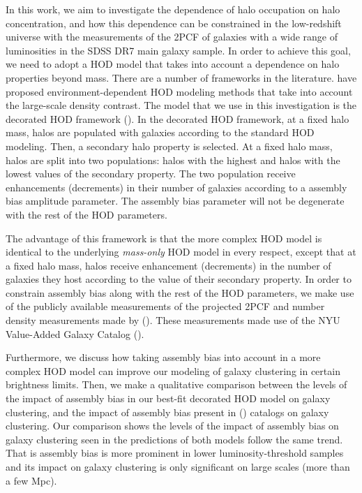 \documentclass[12pt, preprint]{aastex}
\begin{document}
In this work, we aim to investigate the dependence of halo occupation on halo concentration, and how this dependence can be constrained in the low-redshift universe with the measurements of the 2PCF of galaxies with a wide range of luminosities in the SDSS DR7 main galaxy sample. 
In order to achieve this goal, we need to adopt a HOD model that takes into account 
a dependence on halo properties beyond mass. There are a number of frameworks in the literature. \citet{edHOD-tinker,edHOD-gillmartin,edHOD-weinberg} have proposed environment-dependent HOD modeling methods that take into account the large-scale density contrast. The model that we use in this investigation is the decorated HOD framework (\citealt{decorated}). In the decorated HOD framework, at a fixed halo mass, halos are populated with galaxies according to the standard HOD modeling. Then, a secondary halo property is selected. At a fixed halo mass, halos are split into two populations: halos with the highest and halos with the lowest values of the secondary property. The two population receive enhancements (decrements) in their number of galaxies according to a assembly bias amplitude parameter. The assembly bias parameter will not be degenerate with the rest of the HOD parameters. 

The advantage of this framework is that the more complex HOD model is identical to the underlying \emph{mass-only} HOD model in every respect, except that at a fixed halo mass, halos receive enhancement (decrements) in the number of galaxies they host according to the value of their secondary property. In order to constrain assembly bias along with the rest of the HOD parameters, we make use of the publicly available measurements of the projected 2PCF and number density measurements made by   
(\citealt{guo2015}). These measurements made use of the NYU Value-Added Galaxy Catalog (\citealt{Blanton2005}).

Furthermore, we discuss how taking assembly bias into account in a more complex HOD model can improve our modeling of galaxy clustering in certain brightness limits. Then, we make a qualitative comparison between the levels of the impact of assembly bias in our best-fit decorated HOD model on galaxy clustering, and the impact of assembly bias present in (\citealt{hw2013}) catalogs on galaxy clustering. Our comparison shows the levels of the impact of assembly bias on galaxy clustering seen in the predictions of both models follow the same trend. That is assembly bias is more prominent in lower luminosity-threshold samples and its impact on galaxy clustering is only significant on large scales (more than a few Mpc).
\end{document}
